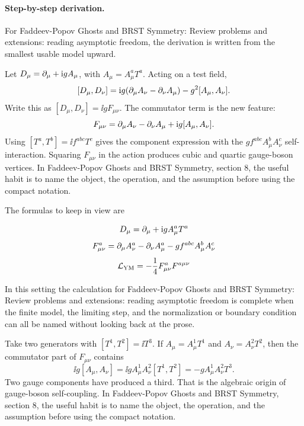 \paragraph{Step-by-step derivation.}

For Faddeev-Popov Ghosts and BRST Symmetry: Review problems and extensions: reading asymptotic freedom, the derivation is written from the smallest usable model upward.

Let \(D_\mu=\partial_\mu+\mathrm i gA_\mu\), with \(A_\mu=A_\mu^aT^a\).  Acting on a test field,
\[
  [D_\mu,D_\nu]
  =
  \mathrm i g(\partial_\mu A_\nu-\partial_\nu A_\mu)-g^2[A_\mu,A_\nu].
\]
Write this as \([D_\mu,D_\nu]=\ii gF_{\mu\nu}\).  The commutator term is the new feature:
\[
  F_{\mu\nu}=\partial_\mu A_\nu-\partial_\nu A_\mu+\mathrm i g[A_\mu,A_\nu].
\]
Using \([T^a,T^b]=\ii f^{abc}T^c\) gives the component expression with the \(gf^{abc}A_\mu^bA_\nu^c\) self-interaction.  Squaring \(F_{\mu\nu}\) in the action produces cubic and quartic gauge-boson vertices.  In Faddeev-Popov Ghosts and BRST Symmetry, section 8, the useful habit is to name the object, the operation, and the assumption before using the compact notation.

The formulas to keep in view are

\[
  D_\mu=\partial_\mu+\mathrm i gA_\mu^aT^a
\]
\[
  F_{\mu\nu}^a=\partial_\mu A_\nu^a-\partial_\nu A_\mu^a-gf^{abc}A_\mu^bA_\nu^c
\]
\[
  \mathcal L_{\mathrm{YM}}=-\frac14F_{\mu\nu}^aF^{a\mu\nu}
\]

In this setting the calculation for Faddeev-Popov Ghosts and BRST Symmetry: Review problems and extensions: reading asymptotic freedom is complete when the finite model, the limiting step, and the normalization or boundary condition can all be named without looking back at the prose.




\begin{example}
Take two generators with \([T^1,T^2]=\ii T^3\).  If \(A_\mu=A_\mu^1T^1\) and \(A_\nu=A_\nu^2T^2\), then the commutator part of \(F_{\mu\nu}\) contains
\[
  \ii g[A_\mu,A_\nu]=\ii gA_\mu^1A_\nu^2[T^1,T^2]=-gA_\mu^1A_\nu^2T^3.
\]
Two gauge components have produced a third.  That is the algebraic origin of gauge-boson self-coupling.  In Faddeev-Popov Ghosts and BRST Symmetry, section 8, the useful habit is to name the object, the operation, and the assumption before using the compact notation.
\end{example}



